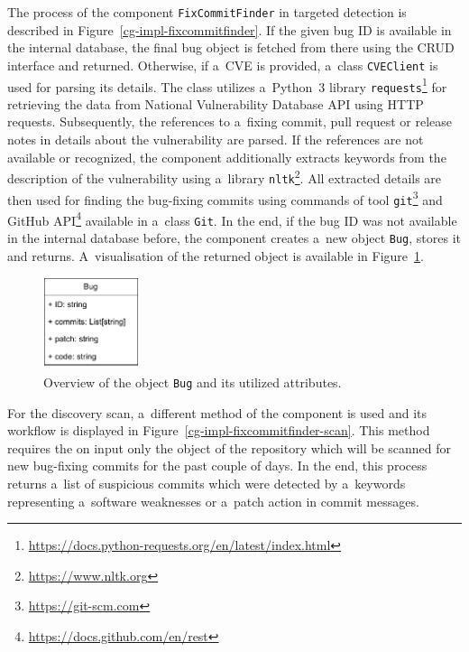   The process of the component \texttt{FixCommitFinder} in targeted detection is described in Figure~\ref{cg-impl-fixcommitfinder}.
  If the given bug ID is available in the internal database, the final bug object is fetched from there using the CRUD interface
  and returned. Otherwise, if a~CVE is provided, a~class \texttt{CVEClient} is used for parsing its details. The class utilizes a~Python~3 library
  \texttt{requests}\footnote{\href{https://docs.python-requests.org/en/latest/index.html}
  {https://docs.python-requests.org/en/latest/index.html}} for retrieving the data from National Vulnerability Database API using
  HTTP requests. Subsequently, the references to a~fixing commit, pull request or release notes in details about the vulnerability
  are parsed. If the references are not available or recognized, the component additionally extracts keywords from the description
  of the vulnerability using a~library \texttt{nltk}\footnote{\href{https://www.nltk.org}{https://www.nltk.org}}. All extracted details
  are then used for finding the bug-fixing commits using commands of tool \texttt{git}\footnote{\href{https://git-scm.com}
  {https://git-scm.com}} and GitHub API\footnote{\href{https://docs.github.com/en/rest}{https://docs.github.com/en/rest}} available
  in a~class \texttt{Git}. In the end, if the bug ID was not available in the internal database before, the component creates a~new
  object \texttt{Bug}, stores it and returns. A~visualisation of the returned object is available in Figure~\ref{cg-impl-bug-object}.

  \begin{figure}[h]
    \centering
    \includegraphics[width=0.25\textwidth]{obrazky-figures/cg_impl_bug_object.drawio.pdf}
    \caption{Overview of the object \texttt{Bug} and its utilized attributes.}
    \label{cg-impl-bug-object}
  \end{figure}

  For the discovery scan, a~different method of the component is used and its workflow is displayed
  in Figure~\ref{cg-impl-fixcommitfinder-scan}. This method requires the on input only the object of the repository
  which will be scanned for new bug-fixing commits for the past couple of days. In the end, this process returns a~list of suspicious
  commits which were detected by a~keywords representing a~software weaknesses or a~patch action in commit messages.

